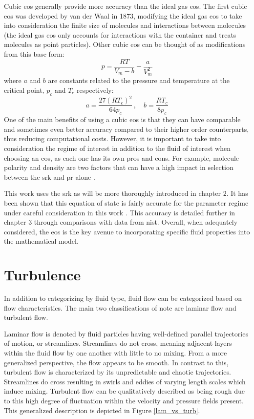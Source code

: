 Cubic \gls{eos} generally provide more accuracy than the ideal gas \gls{eos}. The first cubic \gls{eos} was developed by van der Waal in 1873, modifying the ideal gas \gls{eos} to take into consideration the finite size of molecules and interactions between molecules (the ideal gas \gls{eos} only accounts for interactions with the container and treats molecules as point particles). Other cubic \gls{eos} can be thought of as modifications from this base form: 
\begin{equation} \label{vanderwaal}
p = \dfrac{RT}{V_m - b} - \dfrac{a}{V_m^2}
\end{equation}
where $a$ and $b$ are constants related to the pressure and temperature at the critical point, $p_c$ and $T_c$ respectively: 
$$a = \dfrac{27(RT_c)^2}{64p_c}\,, \quad b = \dfrac{RT_c}{8p_c}$$
One of the main benefits of using a cubic \gls{eos} is that they can have comparable and sometimes even better accuracy compared to their higher order counterparts, thus reducing computational costs. However, it is important to take into consideration the regime of interest in addition to the fluid of interest when choosing an \gls{eos}, as each one has its own pros and cons. For example, molecule polarity and density are two factors that can have a high impact in selection between the \gls{srk} and \gls{pr} alone \cite{GHANBARI201713}. 

This work uses the \gls{srk} as will be more thoroughly introduced in chapter 2. It has been shown that this equation of state is fairly accurate for the parameter regime under careful consideration in this work \cite{}. This accuracy is detailed further in chapter 3 through comparisons with data from \gls{nist}. Overall, when adequately considered, the \gls{eos} is the key avenue to incorporating specific fluid properties into the mathematical model.


\section{Turbulence}
In addition to categorizing by fluid type, fluid flow can be categorized based on flow characteristics. The main two classifications of note are laminar flow and turbulent flow.

Laminar flow is denoted by fluid particles having well-defined parallel trajectories of motion, or streamlines. Streamlines do not cross, meaning adjacent layers within the fluid flow by one another with little to no mixing. From a more generalized perspective, the flow appears to be smooth. In contrast to this, turbulent flow is characterized by its unpredictable and chaotic trajectories. Streamlines do cross resulting in swirls and eddies of varying length scales which induce mixing. Turbulent flow can be qualitatively described as being rough due to this high degree of fluctuation within the velocity and pressure fields present. This generalized description is depicted in Figure \ref{lam_vs_turb}.

